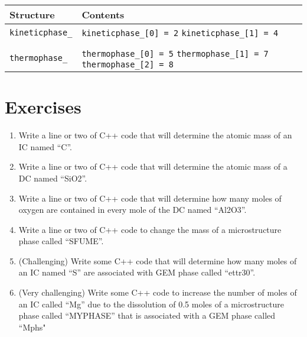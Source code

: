 \documentclass{article}
\begin{document}
\scriptsize{
\begin{tabular}{l p{4.0in}} \toprule
\textbf{Structure} & \textbf{Contents} \\ \midrule
\verb!kineticphase_! & \verb!kineticphase_[0] = 2! \hspace{0.1in} 
                 \verb!kineticphase_[1] = 4! \\
                 & \\
\verb!thermophase_! & \verb!thermophase_[0] = 5! \hspace{0.1in}
\verb!thermophase_[1] = 7! \hspace{0.1in}
                 \verb!thermophase_[2] = 8! \\ \bottomrule
\end{tabular}
}

\normalsize{ }

\section{Exercises}

\begin{enumerate}
    \item Write a line or two of C++ code that will determine the atomic mass of
        an IC named ``C''.
    \item Write a line or two of C++ code that will determine the atomic mass of
        a DC named ``SiO2''.
    \item Write a line or two of C++ code that will determine how many moles of
        oxygen are contained in every mole of the DC named ``Al2O3''.
    \item Write a line or two of C++ code to change the mass of a microstructure phase called
        ``SFUME''.
    \item (Challenging) Write some C++ code that will determine how many moles
        of an IC named ``S'' are associated with GEM phase called ``ettr30''.
    \item (Very challenging) Write some C++ code to increase the number of moles of an IC
        called ``Mg'' due to the dissolution of 0.5 moles of a microstructure phase
        called ``MYPHASE'' that is associated with a GEM phase called ``Mphs"
\end{enumerate}
\end{document}
